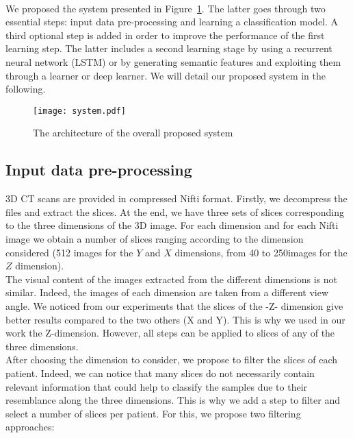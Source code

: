 \paragraph{}
We proposed the system presented in Figure~\ref{fig:system}. The latter goes through two essential steps: input data pre-processing and learning a classification model. A third optional step is added in order to improve the performance of the first learning step. The latter includes a second learning stage by using a recurrent neural network (LSTM) or by generating semantic features and exploiting them through a learner or deep learner. We will detail our proposed system in the following.
\begin{figure}[h!]
\texttt{[image: system.pdf]}
\caption{The architecture of the overall proposed system} 
\label{fig:system}
\end{figure}

\subsection{Input data pre-processing}
\label{preprocess}
3D CT scans are provided in compressed Nifti format. Firstly, we decompress the files and extract the slices. At the end, we have three sets of slices corresponding to the three dimensions of the 3D image. For each dimension and for each Nifti image we obtain a number of slices ranging according to the dimension considered (512 images for the $Y$ and $X$ dimensions, from 40 to 250images for the $Z$ dimension).\\

The visual content of the images extracted from the different dimensions is not similar. Indeed, the images of each dimension are taken from a different view angle. We noticed from our experiments that the slices of the -Z- dimension give better results compared to the two others (X and Y). This is why we used in our work the Z-dimension. However, all steps can be applied to slices of any of the three dimensions.\\



After choosing the dimension to consider, we propose to filter the slices of each patient. Indeed, we can notice that many slices do not necessarily contain relevant information that could help to classify the samples due to their resemblance along the three dimensions. This is why we add a step to filter and select a number of slices per patient. For this, we propose two filtering approaches:\\


